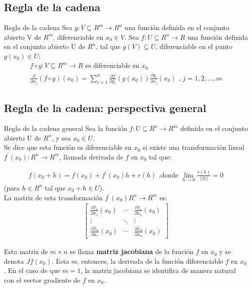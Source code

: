 \documentclass[a4paper, twoside]{article}
\numberwithin{equation}{section}
\numberwithin{figure}{section}
\numberwithin{table}{section}
\begin{document}
\subsection{Regla de la cadena}
\begin{teorema*}{Regla de la cadena}
	Sea $g: V \subseteq R^m \to R^n$ una función definida en el conjunto abierto V de $R^m$, diferenciable en $x_0 \in V$. Sea $f:U\subseteq R^n \to R$ una función definida en el conjunto abierto U de $R^n$, tal que $g(V) \subseteq U$, diferenciable en el punto $g(x_0) \in U$:
	\begin{align}
		f\circ g:V\subseteq R^m \to R \text{ es diferenciable en } x_0 \\
		\frac{\partial}{\partial x_j}(f \circ g)(x_0) = \sum_{i=1}^{n}\frac{\partial f}{\partial y_i}(g(x_0)) \frac{\partial g_i}{\partial x_j} (x_0) \text{ , } j=1,2,\ldots,m
	\end{align}
\end{teorema*}

\subsection{Regla de la cadena: perspectiva general}
\begin{definicion*}{Regla de la cadena general}
	Sea la función $f:U\subseteq R^n \to R^m$ definida en el conjunto abierto U de $R^n$, y sea $x_0\in U$.\\
			
	Se dice que esta función es diferenciable en $x_0$ si existe una transformación lineal $f^\prime (x_0):R^n \to R^m$, llamada derivada de $f$ en $x_0$ tal que:
	
	\begin{align}
		f(x_0+h)=f(x_0)+f^\prime(x_0)h+r(h) \text{ ,donde } \lim_{h\to0}\frac{r\left(h\right)}{\left|\left|h\right|\right|}=0
	\end{align}
	(para $h \in R^n$ tal que $x_0+h\in U$).\\
	
	La matriz de esta transformación $f^\prime(x_0) R^n\to R^m$ es:
	\begin{align}
		\left[\begin{array}{ccc}
		\frac{\partial f_1}{\partial x_1}(x_0) & \cdots & \frac{\partial f_1}{\partial x_n}(x_0)\\
		\vdots & \ddots & \vdots\\
		\frac{\partial f_m}{\partial x_1}(x_0) & \cdots & \frac{\partial f_m}{\partial x_n}(x_0)\end{array}\right]
	\end{align}
	
	Esta matriz de $m\times n$ se llama \textbf{matriz jacobiana} de la función $f$ en $x_0$ y se denota $Jf(x_0)$. Esta es, entonces, la derivada de la función diferenciable $f$ en $x_0$. En el caso de que $m=1$, la matriz jacobiana se identifica de manera natural con el vector gradiente de $f$ en $x_0$.\\
\end{definicion*}
\end{document}
